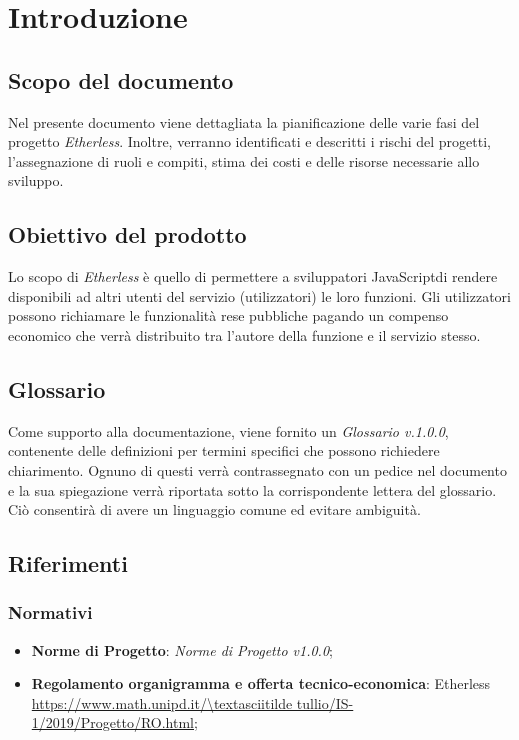 \section{Introduzione}

\subsection{Scopo del documento}
Nel presente documento viene dettagliata la pianificazione delle varie fasi del progetto \textit{Etherless}. Inoltre, verranno identificati e descritti i rischi del progetti, l'assegnazione di ruoli e compiti, stima dei costi e delle risorse necessarie allo sviluppo.

\subsection{Obiettivo del prodotto}
Lo scopo di \textit{Etherless} è quello di permettere a sviluppatori JavaScript\glo di rendere disponibili ad altri utenti del servizio (utilizzatori) le loro funzioni. Gli utilizzatori possono richiamare le funzionalità rese pubbliche pagando un compenso economico che verrà distribuito tra l'autore della funzione e il servizio stesso.
	
\subsection{Glossario}
Come supporto alla documentazione, viene fornito un \textit{Glossario v.1.0.0}, contenente delle definizioni per termini specifici che possono richiedere chiarimento. Ognuno di questi verrà contrassegnato con un pedice \glo nel documento e la sua spiegazione verrà riportata sotto la corrispondente lettera del glossario. Ciò consentirà di avere un linguaggio comune ed evitare ambiguità. 
	
\subsection{Riferimenti}
\subsubsection{Normativi}
	\begin{itemize}
		\item \textbf{Norme di Progetto}: \textit{Norme di Progetto v1.0.0};
		\item \textbf{Regolamento organigramma e offerta tecnico-economica}: Etherless\\ 
			\url{https://www.math.unipd.it/\textasciitilde tullio/IS-1/2019/Progetto/RO.html};
	\end{itemize}
